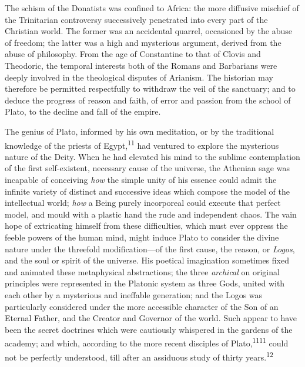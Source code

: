 


The schism of the Donatists was confined to Africa: the more
diffusive mischief of the Trinitarian controversy successively
penetrated into every part of the Christian world. The former was
an accidental quarrel, occasioned by the abuse of freedom; the
latter was a high and mysterious argument, derived from the abuse
of philosophy. From the age of Constantine to that of Clovis and
Theodoric, the temporal interests both of the Romans and
Barbarians were deeply involved in the theological disputes of
Arianism. The historian may therefore be permitted respectfully
to withdraw the veil of the sanctuary; and to deduce the progress
of reason and faith, of error and passion from the school of
Plato, to the decline and fall of the empire.

The genius of Plato, informed by his own meditation, or by the
traditional knowledge of the priests of Egypt,\textsuperscript{11} had ventured to
explore the mysterious nature of the Deity. When he had elevated
his mind to the sublime contemplation of the first self-existent,
necessary cause of the universe, the Athenian sage was incapable
of conceiving \textit{how} the simple unity of his essence could admit
the infinite variety of distinct and successive ideas which
compose the model of the intellectual world; \textit{how} a Being purely
incorporeal could execute that perfect model, and mould with a
plastic hand the rude and independent chaos. The vain hope of
extricating himself from these difficulties, which must ever
oppress the feeble powers of the human mind, might induce Plato
to consider the divine nature under the threefold modification—of
the first cause, the reason, or \textit{Logos}, and the soul or spirit
of the universe. His poetical imagination sometimes fixed and
animated these metaphysical abstractions; the three \textit{archical} on
original principles were represented in the Platonic system as
three Gods, united with each other by a mysterious and ineffable
generation; and the Logos was particularly considered under the
more accessible character of the Son of an Eternal Father, and
the Creator and Governor of the world. Such appear to have been
the secret doctrines which were cautiously whispered in the
gardens of the academy; and which, according to the more recent
disciples of Plato,\textsuperscript{1111} could not be perfectly understood, till
after an assiduous study of thirty years.\textsuperscript{12}

